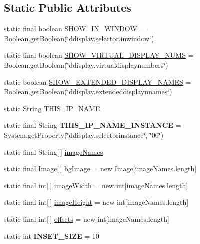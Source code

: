 \subsection*{Static Public Attributes}
\begin{DoxyCompactItemize}
\item 
static final boolean \hyperlink{classgov_1_1fnal_1_1ppd_1_1dd_1_1GlobalVariables_af0e7b37c8bf6495b999b93ed0f4f1c76}{S\-H\-O\-W\-\_\-\-I\-N\-\_\-\-W\-I\-N\-D\-O\-W} = Boolean.\-get\-Boolean(\char`\"{}ddisplay.\-selector.\-inwindow\char`\"{})
\item 
static final boolean \hyperlink{classgov_1_1fnal_1_1ppd_1_1dd_1_1GlobalVariables_a7ccfa5abda77efe03cd888f14d4171a3}{S\-H\-O\-W\-\_\-\-V\-I\-R\-T\-U\-A\-L\-\_\-\-D\-I\-S\-P\-L\-A\-Y\-\_\-\-N\-U\-M\-S} = Boolean.\-get\-Boolean(\char`\"{}ddisplay.\-virtualdisplaynumbers\char`\"{})
\item 
static boolean \hyperlink{classgov_1_1fnal_1_1ppd_1_1dd_1_1GlobalVariables_a24c624ba470a455c7ed0c43d72a9f417}{S\-H\-O\-W\-\_\-\-E\-X\-T\-E\-N\-D\-E\-D\-\_\-\-D\-I\-S\-P\-L\-A\-Y\-\_\-\-N\-A\-M\-E\-S} = Boolean.\-get\-Boolean(\char`\"{}ddisplay.\-extendeddisplaynnames\char`\"{})
\item 
static String \hyperlink{classgov_1_1fnal_1_1ppd_1_1dd_1_1GlobalVariables_a35adf140ccbaaf275e34d1539424828a}{T\-H\-I\-S\-\_\-\-I\-P\-\_\-\-N\-A\-M\-E}
\item 
\hypertarget{classgov_1_1fnal_1_1ppd_1_1dd_1_1GlobalVariables_ae5fe9c75fedaa742e5f68baad8768d7f}{static final String {\bfseries T\-H\-I\-S\-\_\-\-I\-P\-\_\-\-N\-A\-M\-E\-\_\-\-I\-N\-S\-T\-A\-N\-C\-E} = System.\-get\-Property(\char`\"{}ddisplay.\-selectorinstance\char`\"{}, \char`\"{}00\char`\"{})}\label{classgov_1_1fnal_1_1ppd_1_1dd_1_1GlobalVariables_ae5fe9c75fedaa742e5f68baad8768d7f}

\item 
static final String\mbox{[}$\,$\mbox{]} \hyperlink{classgov_1_1fnal_1_1ppd_1_1dd_1_1GlobalVariables_a356be5e37e706b201f6bc26130b73ce3}{image\-Names}
\item 
static final Image\mbox{[}$\,$\mbox{]} \hyperlink{classgov_1_1fnal_1_1ppd_1_1dd_1_1GlobalVariables_a912d45efb46176a8ccd9ce8e046695b0}{bg\-Image} = new Image\mbox{[}image\-Names.\-length\mbox{]}
\item 
static final int\mbox{[}$\,$\mbox{]} \hyperlink{classgov_1_1fnal_1_1ppd_1_1dd_1_1GlobalVariables_a88625f4c1de90b1b1bb20c05fd993617}{image\-Width} = new int\mbox{[}image\-Names.\-length\mbox{]}
\item 
static final int\mbox{[}$\,$\mbox{]} \hyperlink{classgov_1_1fnal_1_1ppd_1_1dd_1_1GlobalVariables_a4c27cf0455687a5f58b71ae0d20fd671}{image\-Height} = new int\mbox{[}image\-Names.\-length\mbox{]}
\item 
static final int\mbox{[}$\,$\mbox{]} \hyperlink{classgov_1_1fnal_1_1ppd_1_1dd_1_1GlobalVariables_aa46c72aaa61e4f90401679376f6071f5}{offsets} = new int\mbox{[}image\-Names.\-length\mbox{]}
\item 
\hypertarget{classgov_1_1fnal_1_1ppd_1_1dd_1_1GlobalVariables_a938952f27836544cbcf8eed0fceecb99}{static int {\bfseries I\-N\-S\-E\-T\-\_\-\-S\-I\-Z\-E} = 10}\label{classgov_1_1fnal_1_1ppd_1_1dd_1_1GlobalVariables_a938952f27836544cbcf8eed0fceecb99}


\end{DoxyCompactItemize}

